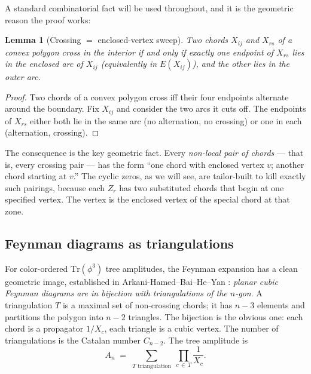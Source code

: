 \documentclass[11pt]{article}
\newtheorem{lemma}[theorem]{Lemma}
\theoremstyle{definition}
\newcommand{\Tr}{\mathrm{Tr}}
\begin{document}
A standard combinatorial fact will be used throughout, and it is the geometric reason the proof works:
\begin{lemma}[Crossing $=$ enclosed-vertex sweep] \label{lem:crossing}
Two chords $X_{ij}$ and $X_{rs}$ of a convex polygon cross in the interior if and only if exactly one endpoint of $X_{rs}$ lies in the enclosed arc of $X_{ij}$ (equivalently in $E(X_{ij})$), and the other lies in the outer arc.
\end{lemma}
\begin{proof}
Two chords of a convex polygon cross iff their four endpoints alternate around the boundary. Fix $X_{ij}$ and consider the two arcs it cuts off. The endpoints of $X_{rs}$ either both lie in the same arc (no alternation, no crossing) or one in each (alternation, crossing).
\end{proof}

\noindent
The consequence is the key geometric fact. Every \emph{non-local pair of chords} --- that is, every crossing pair --- has the form ``one chord with enclosed vertex $v$; another chord starting at $v$.'' The cyclic zeros, as we will see, are tailor-built to kill exactly such pairings, because each $Z_r$ has two substituted chords that begin at one specified vertex. The vertex is the enclosed vertex of the special chord at that zone.

\subsection{Feynman diagrams as triangulations} \label{sec:feyntri}

For color-ordered $\Tr(\phi^3)$ tree amplitudes, the Feynman expansion has a clean geometric image, established in Arkani-Hamed--Bai--He--Yan \cite{ABHY}: \emph{planar cubic Feynman diagrams are in bijection with triangulations of the $n$-gon}. A triangulation $T$ is a maximal set of non-crossing chords; it has $n-3$ elements and partitions the polygon into $n-2$ triangles. The bijection is the obvious one: each chord is a propagator $1/X_c$, each triangle is a cubic vertex. The number of triangulations is the Catalan number $C_{n-2}$. The tree amplitude is
\begin{equation}
A_n \;=\; \sum_{T\text{ triangulation}} \;\prod_{c\,\in\,T} \frac{1}{X_c}.
\label{eq:Antree}
\end{equation}
\end{document}
